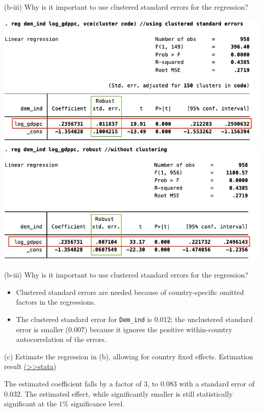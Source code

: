 \documentclass[
  10pt,
  ignorenonframetext,
]{beamer}
\begin{document}
\begin{frame}{(b-iii) Why is it important to use clustered standard
errors \quad for the regression?}
\protect\hypertarget{b-iii-why-is-it-important-to-use-clustered-standard-errors-for-the-regression}{}
\begin{center}\includegraphics[width=0.49\linewidth]{pictures/Ex2-pooledsimplewithclustering} \includegraphics[width=0.49\linewidth]{pictures/Ex2-pooledsimplemoclustering} \end{center}
\end{frame}

\begin{frame}[fragile]{(b-iii) Why is it important to use clustered
standard errors \quad for the regression?}
\protect\hypertarget{b-iii-why-is-it-important-to-use-clustered-standard-errors-for-the-regression-1}{}
\begin{itemize}
\item
  Clustered standard errors are needed because of country-specific
  omitted factors in the regressions.
\item
  The clustered standard error for \texttt{Dem\_ind} is \(0.012\); the
  unclustered standard error is smaller (\(0.007\)) because it ignores
  the positive within-country autocorrelation of the errors.
\end{itemize}
\end{frame}

\begin{frame}{(c) Estimate the regression in (b), allowing for country
fixed effects.}
\protect\hypertarget{Ex2-CountryFEs-A}{}
Estimation result
\footnotesize \protect\hyperlink{Ex2-CountryFEs}{(\textgreater\textgreater stata)}
\normalsize

The estimated coefficient falls by a factor of \(3\), to \(0.083\) with
a standard error of \(0.032\). The estimated effect, while significantly
smaller is still statistically significant at the \(1\%\) significance
level.
\end{frame}
\end{document}
